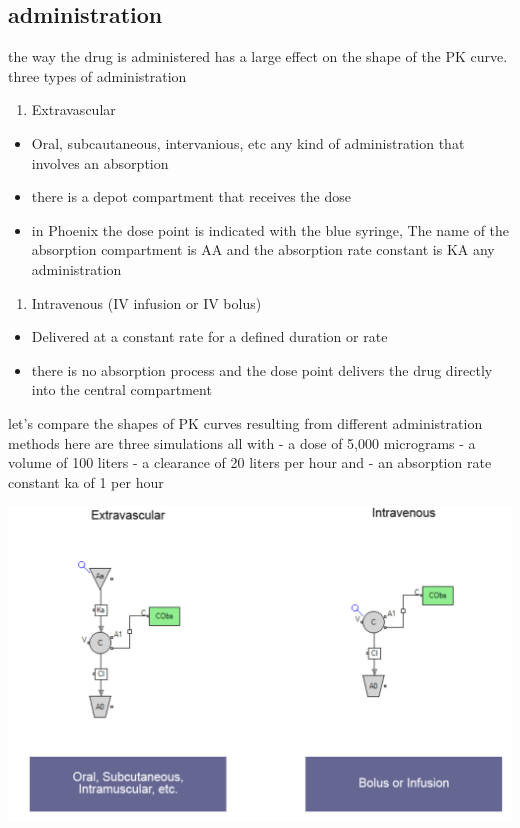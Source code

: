 \documentclass[
  letterpaper,
  DIV=11,
  numbers=noendperiod]{scrreprt}
\providecommand{\tightlist}{%
  \setlength{\itemsep}{0pt}\setlength{\parskip}{0pt}}\usepackage{longtable,booktabs,array}
\begin{document}
\hypertarget{administration}{%
\subsection{administration}\label{administration}}

the way the drug is administered has a large effect on the shape of the
PK curve. three types of administration

\begin{enumerate}
\def\labelenumi{\arabic{enumi}.}
\tightlist
\item
  Extravascular
\end{enumerate}

\begin{itemize}
\tightlist
\item
  Oral, subcautaneous, intervanious, etc any kind of administration that
  involves an absorption
\item
  there is a depot compartment that receives the dose
\item
  in Phoenix the dose point is indicated with the blue syringe, The name
  of the absorption compartment is AA and the absorption rate constant
  is KA any administration
\end{itemize}

\begin{enumerate}
\def\labelenumi{\arabic{enumi}.}
\setcounter{enumi}{1}
\tightlist
\item
  Intravenous (IV infusion or IV bolus)
\end{enumerate}

\begin{itemize}
\tightlist
\item
  Delivered at a constant rate for a defined duration or rate
\item
  there is no absorption process and the dose point delivers the drug
  directly into the central compartment
\end{itemize}

let's compare the shapes of PK curves resulting from different
administration methods here are three simulations all with - a dose of
5,000 micrograms - a volume of 100 liters - a clearance of 20 liters per
hour and - an absorption rate constant ka of 1 per hour

\includegraphics{./img/admin-1.png}
\end{document}
